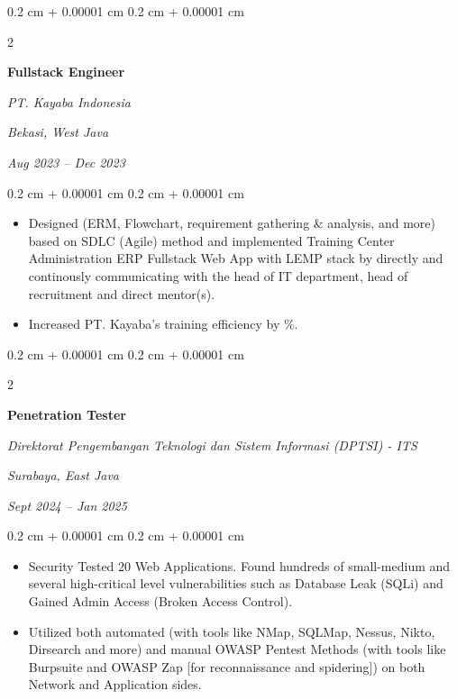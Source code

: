 \documentclass[10pt, letterpaper]{article}
\newenvironment{highlights}{
    \begin{itemize}[
        topsep=0.10 cm,
        parsep=0.10 cm,
        partopsep=0pt,
        itemsep=0pt,
        leftmargin=0.4 cm + 10pt
    ]
}{
    \end{itemize}
} %
\newenvironment{onecolentry}{
    \begin{adjustwidth}{
        0.2 cm + 0.00001 cm
    }{
        0.2 cm + 0.00001 cm
    }
}{
    \end{adjustwidth}
} %
\newenvironment{twocolentry}[2][]{
    \onecolentry
    \def\secondColumn{#2}
    \setcolumnwidth{\fill, 4.5 cm}
    \begin{paracol}{2}
}{
    \switchcolumn \raggedleft \secondColumn
    \end{paracol}
    \endonecolentry
} %
\begin{document}
        \begin{twocolentry}{
        \textit{Bekasi, West Java}    
            
        \textit{Aug 2023 – Dec 2023}}
            \textbf{Fullstack Engineer}
            
            \textit{PT. Kayaba Indonesia}
        \end{twocolentry}

        \vspace{0.10 cm}
        \begin{onecolentry}
            \begin{highlights}
                \item Designed (ERM, Flowchart, requirement gathering \& analysis, and more) based on SDLC (Agile) method and implemented Training Center Administration ERP Fullstack Web App with LEMP stack by directly and continously communicating with the head of IT department, head of recruitment and direct mentor(s).
                \item Increased PT. Kayaba's training efficiency by \%.
            \end{highlights}
        \end{onecolentry}

        \vspace{0.2 cm}

        \begin{twocolentry}{
        \textit{Surabaya, East Java}    
            
        \textit{Sept 2024 – Jan 2025}}
            \textbf{Penetration Tester}
            
            \textit{Direktorat Pengembangan Teknologi dan Sistem Informasi (DPTSI) - ITS}
        \end{twocolentry}

        \vspace{0.10 cm}
        \begin{onecolentry}
            \begin{highlights}
                \item Security Tested 20 Web Applications. Found hundreds of small-medium and several high-critical level vulnerabilities such as Database Leak (SQLi) and Gained Admin Access (Broken Access Control).
                \item Utilized both automated (with tools like NMap, SQLMap, Nessus, Nikto, Dirsearch and more) and manual OWASP Pentest Methods (with tools like Burpsuite and OWASP Zap [for reconnaissance and spidering]) on both Network and Application sides.
            \end{highlights}
        \end{onecolentry}
\end{document}
